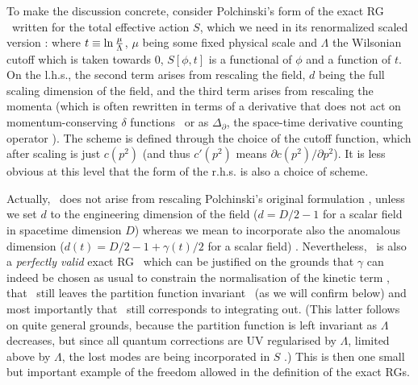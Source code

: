 
To make the discussion concrete, consider Polchinski's form of the exact
RG \pol\ written for the total effective action $S$, 
which we need in its renormalized scaled version \jose:
\eqn{}
where $t\equiv \ln {\mu\over\Lambda}$, $\mu$ being some fixed 
physical scale
and $\Lambda$ the Wilsonian cutoff which is taken towards 0,
$S[\phi,t]$ is a functional of $\phi$ and a function of $t$.
On the l.h.s., the second term arises from rescaling the field,
$d$ being the full scaling dimension of the field, and the third
term arises from rescaling the momenta (which is often rewritten in
terms of a derivative that does not act on momentum-conserving
$\delta$ functions \wegho\ or as $\Delta_\partial$, the space-time
derivative counting operator \deriv).
The scheme is defined through the choice of 
the cutoff function, which after scaling is just $c(p^2)$
(and thus $c'(p^2)$ means $\partial c(p^2)/\partial p^2$).
It is less obvious at this level that the form
of the r.h.s. is also a choice of scheme. 

Actually, \polchinski\ does not arise from rescaling Polchinski's 
original formulation \pol, unless we set $d$ to the engineering dimension
of the field (\ie $d=D/2-1$ for a scalar field in spacetime dimension
$D$) whereas we mean to incorporate also the anomalous dimension
($d(t)=D/2-1+\gamma(t)/2$ for a scalar field) \jose\sumi.
Nevertheless, \polchinski\ is also a {\sl perfectly valid} exact RG 
\jose\alg\ which can be justified on the grounds that $\gamma$ 
can indeed be chosen 
as usual to constrain the normalisation of the kinetic term \jose, that 
\polchinski\ still leaves the partition function invariant \jose\sumi\
(as we will confirm below) and most importantly that \polchinski\ 
still corresponds to integrating out. (This latter follows on quite 
general grounds, 
because the partition function is left invariant as $\Lambda$ decreases,
but since all quantum corrections are UV regularised by $\Lambda$,
\ie limited above by $\Lambda$, the lost modes are being incorporated
in $S$ \ymi.) 
This is then one small but important example of the freedom allowed in
the definition of the exact RGs.


